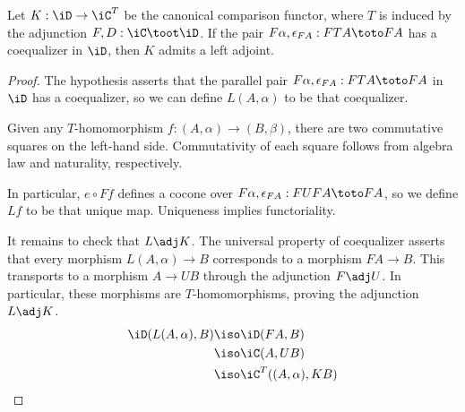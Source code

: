 \documentclass{amsart}
\begin{document}
\begin{lem}\label{lem:beck-coequalizer-left-adjoint}
  Let $K : \iD \to \iC^{T}$ be the canonical comparison functor, where $T$ is induced by the adjunction $F,D : \iC \toot \iD$.
  If the pair $F\alpha,\epsilon_{FA} : FTA \toto FA$ has a coequalizer in $\iD$, then $K$ admits a left adjoint.
\end{lem}
\begin{proof}
  The hypothesis asserts that the parallel pair $F\alpha,\epsilon_{FA} : FTA \toto FA$ in $\iD$ has a coequalizer, so we can define $L(A,\alpha)$ to be that coequalizer.
  
  Given any $T$-homomorphism $f : (A,\alpha) \to (B,\beta)$, there are two commutative squares on the left-hand side.
  Commutativity of each square follows from algebra law and naturality, respectively.
  
  In particular, $e \circ Ff$ defines a cocone over $F\alpha,\epsilon_{FA} : FUFA \toto FA$, so we define $Lf$ to be that unique map.
  Uniqueness implies functoriality.

  It remains to check that $L \adj K$.
  The universal property of coequalizer asserts that every morphism $L(A,\alpha) \to B$ corresponds to a morphism $FA \to B$.
  This transports to a morphism $A \to UB$ through the adjunction $F \adj U$.
  In particular, these morphisms are $T$-homomorphisms, proving the adjunction $L \adj K$.
  \begin{align}
    \iD(L(A,\alpha),B) &\iso \iD(FA,B)\\
                  &\iso \iC(A,UB)\\
                  &\iso \iC^{T}((A,\alpha),KB)
  \end{align}
\end{proof}
\end{document}
